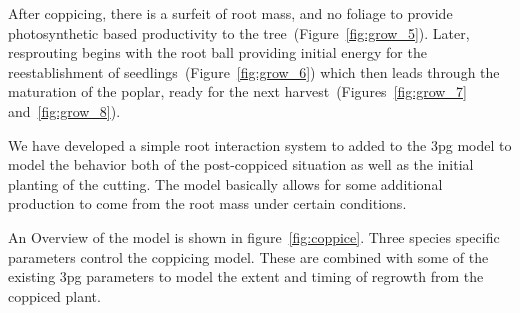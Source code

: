 \documentclass[10pt]{article}
\begin{document}
After coppicing, there is a surfeit of root mass, and no foliage to
provide photosynthetic based productivity to the
tree~(Figure~\ref{fig:grow_5}).  Later, resprouting begins with the
root ball providing initial energy for the reestablishment of
seedlings~(Figure~\ref{fig:grow_6}) which then leads through the
maturation of the poplar, ready for the next
harvest~(Figures~\ref{fig:grow_7} and~\ref{fig:grow_8}).

We have developed a simple root interaction system to added to the
\ac{3pg} model to model the behavior both of the post-coppiced
situation as well as the initial planting of the cutting.  The model
basically allows for some additional production to come from the root
mass under certain conditions.

An Overview of the model is shown in figure~\ref{fig:coppice}.  Three
species specific parameters control the coppicing model.  These are
combined with some of the existing \ac{3pg} parameters to model the
extent and timing of regrowth from the coppiced plant.
\end{document}
